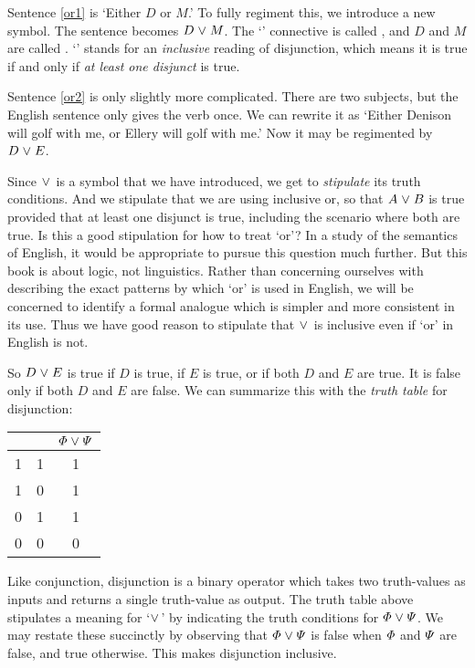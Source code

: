 Sentence \ref{or1} is `Either $D$ or $M$.'
To fully regiment this, we introduce a new symbol.
The sentence becomes $D \mkern1mu\vee\mkern1mu M$.
The `\eor' connective is called , and $D$ and $M$ are called .
`\eor' stands for an \emph{inclusive} reading of disjunction, which means it is true if and only if \emph{at least one disjunct} is true.

Sentence \ref{or2} is only slightly more complicated.
There are two subjects, but the English sentence only gives the verb once.
We can rewrite it as `Either Denison will golf with me, or Ellery will golf with me.'
Now it may be regimented by $D \mkern1mu\vee\mkern1mu E$.


Since $\mkern1mu\vee\mkern1mu$ is a symbol that we have introduced, we get to \textit{stipulate} its truth conditions.
And we stipulate that we are using inclusive or, so that $A \mkern1mu\vee\mkern1mu B$ is true provided that at least one disjunct is true, including the scenario where both are true.
Is this a good stipulation for how to treat `or'?
In a study of the semantics of English, it would be appropriate to pursue this question much further.
But this book is about logic, not linguistics.
Rather than concerning ourselves with describing the exact patterns by which `or' is used in English, we will be concerned to identify a formal analogue which is simpler and more consistent in its use.
Thus we have good reason to stipulate that $\mkern1mu\vee\mkern1mu$ is inclusive even if `or' in English is not. 

So $D \mkern1mu\vee\mkern1mu E$ is true if $D$ is true, if $E$ is true, or if both $D$ and $E$ are true. It is false only if both $D$ and $E$ are false. We can summarize this with the \textit{truth table} for disjunction:

\begin{center}
\begin{tabular}{c|c|c}
\metaA{} & \metaB{} & $\varPhi{}\mkern1mu\vee\mkern1mu\varPsi{}$ \\
\hline
1 & 1 & 1\\
1 & 0 & 1\\
0 & 1 & 1\\
0 & 0 & 0
\end{tabular}
\end{center}

Like conjunction, disjunction is a binary operator which takes two truth-values as inputs and returns a single truth-value as output.
The truth table above stipulates a meaning for `$\mkern1mu\vee\mkern1mu$' by indicating the truth conditions for $\varPhi{} \mkern1mu\vee\mkern1mu \varPsi{}$.
We may restate these succinctly by observing that $\varPhi{} \mkern1mu\vee\mkern1mu \varPsi{}$ is false when $\varPhi{}$ and $\varPsi{}$ are false, and true otherwise.
This makes disjunction inclusive.

